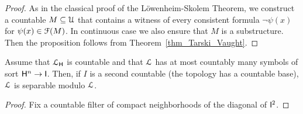 \documentclass[10pt,oneside]{amsproc}
\newcommand{\mylabel}[1]{{#1}\hfill}
\renewenvironment{itemize}
  {\begin{list}{$\triangleright$}{%
  \setlength{\parskip}{0mm}
  \setlength{\topsep}{.4\baselineskip}
  \setlength{\rightmargin}{0mm}
  \setlength{\listparindent}{0mm}
  \setlength{\itemindent}{0mm}
  \setlength{\labelwidth}{3ex}
  \setlength{\itemsep}{.2\baselineskip}
  \setlength{\parsep}{.2\baselineskip}
  \setlength{\partopsep}{0mm}
  \setlength{\labelsep}{1ex}
  \setlength{\leftmargin}{\labelwidth+\labelsep}
  \let\makelabel\mylabel}}{%
\end{list}}
\renewcommand*{\emph}[1]{%
   \smash{\tikz[baseline]\node[rectangle, fill=teal!25, rounded corners, inner xsep=0.5ex, inner ysep=0.2ex, anchor=base, minimum height = 2.7ex]{\strut #1};}}
\begin{document}
{\begin{proof}
  As in the classical proof of the L\"owenheim-Skolem Theorem, we construct a countable $M\subseteq{\EuScript U}$ that contains a witness of every consistent formula $\neg\psi(x)$ for $\psi(x)\in{\EuScript F}(M)$.
  In continuous case we also ensure that $M$ is a substructure.
  Then the proposition follows from Theorem~\ref{thm_Tarski_Vaught}.
\end{proof}

\begin{proposition}
  Assume that ${\EuScript L}_{\sf H}$ is countable and that ${\EuScript L}$ has at most countably many symbols of sort ${\sf H}^n\to {\sf I}$.
  Then, if $I$ is a second countable (the topology has a countable base), ${\EuScript L}$ is separable modulo ${\EuScript L}$.
\end{proposition}

\begin{proof}
  Fix a countable filter of compact neighborhoods of the diagonal of ${\sf I}^2$.  
\end{proof}











}
\end{document}
